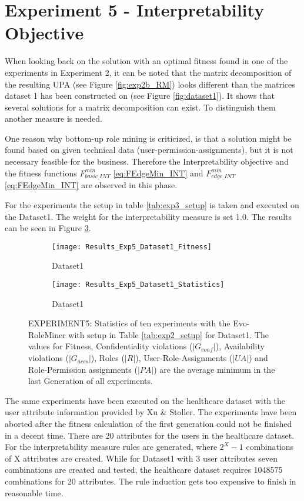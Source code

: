 \newpage
\section{Experiment 5 - Interpretability Objective}
\label{sec:exp5}
When looking back on the solution with an optimal fitness found in one of the experiments in Experiment 2, it can be noted that the matrix decomposition of the resulting UPA (see Figure \ref{fig:exp2b_RM}) looks different than the matrices dataset 1 has been constructed on (see Figure \ref{fig:dataset1}). It shows that several solutions for a matrix decomposition can exist. To distinguish them another measure is needed. 

One reason why bottom-up role mining is criticized, is that a solution might be found based on given technical data (user-permission-assignments), but it is not necessary feasible for the business. Therefore the Interpretability objective and the fitness functions
$F_{basic\_INT}^{min}$ \eqref{eq:FEdgeMin_INT} and $F_{edge\_INT}^{min}$ \eqref{eq:FEdgeMin_INT} are observed in this phase.

For the experiments the setup in table \ref{tab:exp3_setup} is taken and executed on the Dataset1. The weight for the interpretability measure is set 1.0. The results can be seen in Figure \ref{fig:Results_Exp5}.

\begin{figure}[H]
	\centering
	\begin{subfigure}{0.45\textwidth}
		\texttt{[image: Results\_Exp5\_Dataset1\_Fitness]}
		\caption{Dataset1}
		\label{fig:Results_Exp5_Dataset1_Fitness}
	\end{subfigure}%
	\begin{subfigure}{0.55\textwidth}
		\centering
		\texttt{[image: Results\_Exp5\_Dataset1\_Statistics]}
		\caption{Dataset1}
		\label{fig:Results_Exp5_Dataset1_Statistics}
	\end{subfigure}
	\caption{EXPERIMENT5: Statistics of ten experiments with the Evo-RoleMiner with setup in Table \ref{tab:exp2_setup} for Dataset1. The values for Fitness, Confidentiality violations ($|G_{conf}|$), Availability violations ($|G_{accs}|$), Roles ($|R|$), User-Role-Assignments ($|UA|$) and Role-Permission assignments ($|PA|$) are the average minimum in the last Generation of all experiments.}
	\label{fig:Results_Exp5}
\end{figure}

The same experiments have been executed on the healthcare dataset with the user attribute information provided by Xu \& Stoller\cite{Xu}. The experiments have been aborted after the fitness calculation of the first generation could not be finished in a decent time. There are 20 attributes for the users in the healthcare dataset. For the interpretability measure rules are generated, where $2^X-1$ combinations of X attributes are created. While for Dataset1 with 3 user attributes seven combinations are created and tested, the healthcare dataset requires 1048575 combinations for 20 attributes. The rule induction gets too expensive to finish in reasonable time.